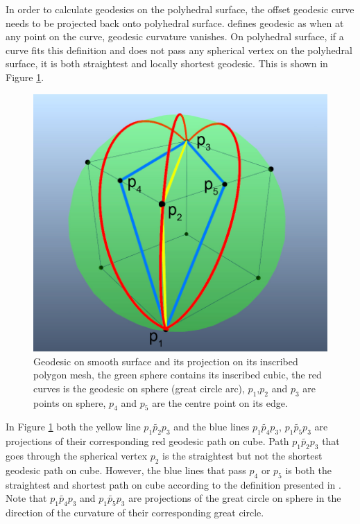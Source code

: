 In order to calculate geodesics on the polyhedral surface, the offset geodesic curve needs to be projected back onto polyhedral surface.  defines geodesic as when at any point on the curve, geodesic curvature vanishes. On polyhedral surface, if a curve fits this definition and does not pass any spherical vertex on the polyhedral surface, it is both straightest and locally shortest geodesic. This is shown in Figure \ref{figure:straightest_geopath_demo}.

\begin{figure}[H]
    \centering
    \includegraphics[width=0.9\columnwidth]{../images/geodesic_image/straightest_geodesic_demo2}
    \caption[Geodesic on a smooth surface and its projection on its inscribed polygon mesh]{Geodesic on smooth surface and its projection on its inscribed polygon mesh, the green sphere contains its inscribed cubic, the red curves is the geodesic on sphere (great circle arc), $p_1$,$p_2$ and $p_3$ are points on sphere, $p_4$ and $p_5$ are the centre point on its edge.}
    \label{figure:straightest_geopath_demo}
\end{figure}

In Figure \ref{figure:straightest_geopath_demo} both the yellow line $\widetilde{p_1p_2p_3}$ and the blue lines $\widetilde{p_1p_4p_3}$, $\widetilde{p_1p_5p_3}$ are projections of their corresponding red geodesic path on cube. Path $\widetilde{p_1p_2p_3}$ that goes through the spherical vertex $p_2$ is the straightest but not the shortest geodesic path on cube. However, the blue lines that pass $p_4$ or $p_5$ is both the straightest and shortest path on cube according to the definition presented in . Note that $\widetilde{p_1p_4p_3}$ and $\widetilde{p_1p_5p_3}$ are projections of the great circle on sphere in the direction of the curvature of their corresponding great circle. 

